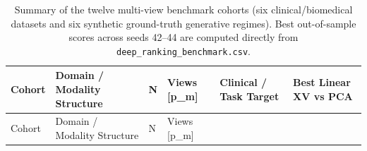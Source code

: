 \documentclass[
  10pt,
  letterpaper,
]{report}
\begin{document}
\begin{longtable}[]{@{}
  >{\raggedright\arraybackslash}p{}
  >{\raggedright\arraybackslash}p{}
  >{\raggedleft\arraybackslash}p{}
  >{\raggedright\arraybackslash}p{}
  >{\raggedright\arraybackslash}p{}
  >{\raggedright\arraybackslash}p{}@{}}
\caption{Summary of the twelve multi-view benchmark cohorts (six
clinical/biomedical datasets and six synthetic ground-truth generative
regimes). Best out-of-sample scores across seeds 42--44 are computed
directly from
\protect\texttt{deep\_ranking\_benchmark.csv}.}\label{tbl-benchmark-cohorts}\tabularnewline
\toprule\noalign{}
\begin{minipage}[b]{\linewidth}\raggedright
Cohort
\end{minipage} & \begin{minipage}[b]{\linewidth}\raggedright
Domain / Modality Structure
\end{minipage} & \begin{minipage}[b]{\linewidth}\raggedleft
N
\end{minipage} & \begin{minipage}[b]{\linewidth}\raggedright
Views {[}p\_m{]}
\end{minipage} & \begin{minipage}[b]{\linewidth}\raggedright
Clinical / Task Target
\end{minipage} & \begin{minipage}[b]{\linewidth}\raggedright
Best Linear XV vs PCA
\end{minipage} \\
\midrule\noalign{}
\endfirsthead
\toprule\noalign{}
\begin{minipage}[b]{\linewidth}\raggedright
Cohort
\end{minipage} & \begin{minipage}[b]{\linewidth}\raggedright
Domain / Modality Structure
\end{minipage} & \begin{minipage}[b]{\linewidth}\raggedleft
N
\end{minipage} & \begin{minipage}[b]{\linewidth}\raggedright
Views {[}p\_m{]}
\end{minipage} & \begin{minipage}[b]{\linewidth}\raggedright

\end{minipage}
\end{longtable}
\end{document}
